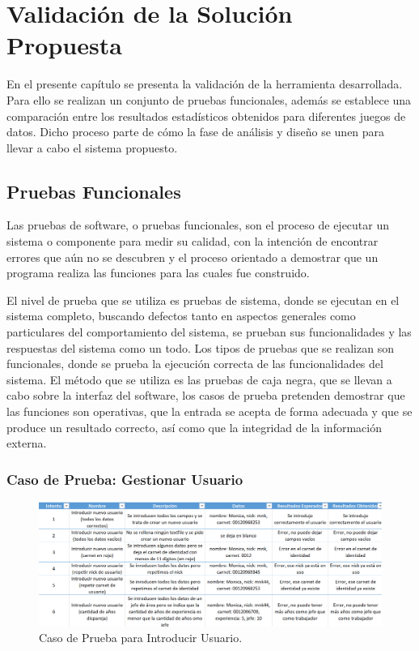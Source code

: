 \chapter{Validación de la Solución Propuesta}\label{chap:3}
En el presente capítulo se presenta la validación de la herramienta desarrollada. Para ello se realizan un conjunto de pruebas funcionales, además se establece una comparación entre los resultados estadísticos obtenidos para diferentes juegos de datos. Dicho proceso parte de cómo la fase de análisis y diseño se unen para llevar a cabo el sistema propuesto.

\section{Pruebas Funcionales}
Las pruebas de software, o pruebas funcionales, son el proceso de ejecutar un sistema o componente para medir su calidad, con la intención de encontrar errores que aún no se descubren y el proceso orientado a demostrar que un programa realiza las funciones para las cuales fue construido.

El nivel de prueba que se utiliza es pruebas de sistema, donde se ejecutan en el sistema completo, buscando defectos tanto en aspectos generales como particulares del comportamiento del sistema, se prueban sus funcionalidades y las respuestas del sistema como un todo. Los tipos de pruebas que se realizan son funcionales, donde se prueba la ejecución correcta de las funcionalidades del sistema. El método que se utiliza es las pruebas de caja negra, que se llevan a cabo sobre la interfaz del software, los casos de prueba pretenden demostrar que las funciones son operativas, que la entrada se acepta de forma adecuada y que se produce un resultado correcto, así como que la integridad de la información externa. 

\subsection{Caso de Prueba: Gestionar Usuario}
\begin{figure}[h]
\centering
 \includegraphics[width=0.8\linewidth]{imagen/introducirU.png}
 \caption{Caso de Prueba para Introducir Usuario.}
 \label{fig:introducirU} 
\end{figure}

